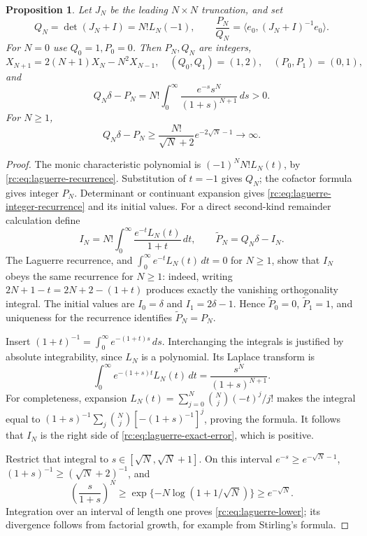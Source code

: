 \documentclass[11pt,a4paper]{article}
\newtheorem{proposition}[theorem]{Proposition}
\theoremstyle{definition}
\theoremstyle{remark}
\theoremstyle{plain}
\numberwithin{equation}{section}
\begin{document}
\begin{proposition}\label{rc:prop:laguerre-error}
Let $J_N$ be the leading $N\times N$ truncation, and set
\[
 Q_N=\det(J_N+I)=N!L_N(-1),\qquad
 \frac{P_N}{Q_N}=\langle e_0,(J_N+I)^{-1}e_0\rangle.
\]
For $N=0$ use $Q_0=1,P_0=0$.  Then $P_N,Q_N$ are integers,
\begin{equation}\label{rc:eq:laguerre-integer-recurrence}
 X_{N+1}=2(N+1)X_N-N^2X_{N-1},\quad
 (Q_0,Q_1)=(1,2),\quad(P_0,P_1)=(0,1),
\end{equation}
and
\begin{equation}\label{rc:eq:laguerre-exact-error}
 Q_N\delta-P_N
 =N!\int_0^\infty\frac{e^{-s}s^N}{(1+s)^{N+1}}\,ds>0.
\end{equation}
For $N\ge1$,
\begin{equation}\label{rc:eq:laguerre-lower}
 Q_N\delta-P_N\ge
 \frac{N!}{\sqrt N+2}e^{-2\sqrt N-1}\longrightarrow\infty.
\end{equation}
\end{proposition}

\begin{proof}
The monic characteristic polynomial is $(-1)^NN!L_N(t)$, by
\eqref{rc:eq:laguerre-recurrence}.  Substitution of $t=-1$ gives $Q_N$;
the cofactor formula gives integer $P_N$.  Determinant or continuant
expansion gives \eqref{rc:eq:laguerre-integer-recurrence} and its initial
values.  For a direct second-kind remainder calculation define
\[
 I_N=N!\int_0^\infty\frac{e^{-t}L_N(t)}{1+t}\,dt,
 \qquad \widetilde P_N=Q_N\delta-I_N.
\]
The Laguerre recurrence, and $\int_0^\infty e^{-t}L_N(t)\,dt=0$
for $N\ge1$, show that $I_N$ obeys the same recurrence for $N\ge1$:
indeed, writing $2N+1-t=2N+2-(1+t)$ produces exactly the vanishing
orthogonality integral.  The initial values are $I_0=\delta$ and
$I_1=2\delta-1$.  Hence $\widetilde P_0=0$, $\widetilde P_1=1$, and
uniqueness for the recurrence identifies $\widetilde P_N=P_N$.

Insert $(1+t)^{-1}=\int_0^\infty e^{-(1+t)s}\,ds$.  Interchanging the
integrals is justified by absolute integrability, since $L_N$ is a
polynomial.  Its Laplace transform is
\[
 \int_0^\infty e^{-(1+s)t}L_N(t)\,dt
       =\frac{s^N}{(1+s)^{N+1}}.
\]
For completeness, expansion
$L_N(t)=\sum_{j=0}^N\binom Nj(-t)^j/j!$ makes the integral equal to
$(1+s)^{-1}\sum_j\binom Nj[-(1+s)^{-1}]^j$, proving the formula.
It follows that $I_N$ is the right side of
\eqref{rc:eq:laguerre-exact-error}, which is positive.

Restrict that integral to $s\in[\sqrt N,\sqrt N+1]$.  On this interval
$e^{-s}\ge e^{-\sqrt N-1}$, $(1+s)^{-1}\ge(\sqrt N+2)^{-1}$, and
\[
 \left(\frac{s}{1+s}\right)^N
 \ge\exp\{-N\log(1+1/\sqrt N)\}\ge e^{-\sqrt N}.
\]
Integration over an interval of length one proves
\eqref{rc:eq:laguerre-lower}; its divergence follows from factorial
growth, for example from Stirling's formula.
\end{proof}
\end{document}
